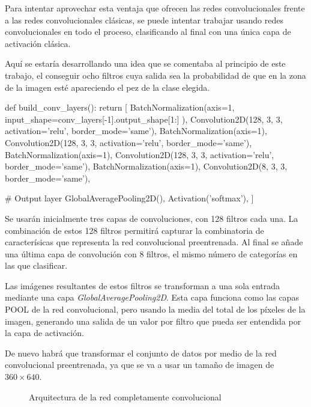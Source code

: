 Para intentar aprovechar esta ventaja que ofrecen las redes convolucionales frente a las redes convolucionales clásicas, se puede intentar trabajar usando redes convolucionales en todo el proceso, clasificando al final con una única capa de activación clásica.

Aquí se estaría desarrollando una idea que se comentaba al principio de este trabajo, el conseguir ocho filtros cuya salida sea la probabilidad de que en la zona de la imagen esté apareciendo el pez de la clase elegida.

\begin{python}
def build_conv_layers():
    return [
        BatchNormalization(axis=1,
            input_shape=conv_layers[-1].output_shape[1:]
        ),
        Convolution2D(128, 3, 3, activation='relu', border_mode='same'),
        BatchNormalization(axis=1),
        Convolution2D(128, 3, 3, activation='relu', border_mode='same'),
        BatchNormalization(axis=1),
        Convolution2D(128, 3, 3, activation='relu', border_mode='same'),
        BatchNormalization(axis=1),
        Convolution2D(8, 3, 3, border_mode='same'),

        # Output layer
        GlobalAveragePooling2D(),
        Activation('softmax'),
    ]
\end{python}

Se usarán inicialmente tres capas de convoluciones, con 128 filtros cada una. La combinación de estos 128 filtros permitirá capturar la combinatoria de caracterísicas que representa la red convolucional preentrenada. Al final se añade una última capa de convolución con 8 filtros, el mismo número de categorías en las que clasificar.

Las imágenes resultantes de estos filtros se transforman a una sola entrada mediante una capa \textit{GlobalAveragePooling2D}. Esta capa funciona como las capas POOL de la red convolucional, pero usando la media del total de los píxeles de la imagen, generando una salida de un valor por filtro que pueda ser entendida por la capa de activación.

De nuevo habrá que transformar el conjunto de datos por medio de la red convolucional preentrenada, ya que se va a usar un tamaño de imagen de $360\times640$.

\begin{figure}
    \caption{Arquitectura de la red completamente convolucional}
\label{fcn_arch}
\end{figure}

